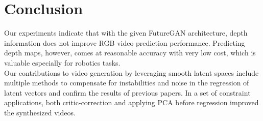 \documentclass[10pt,twocolumn,letterpaper]{article}
\begin{document}
\section{Conclusion}
	Our experiments indicate that with the given FutureGAN architecture, depth information does not improve RGB video prediction performance. Predicting depth maps, however, comes at reasonable accuracy with very low cost, which is valuable especially for robotics tasks. \\
	Our contributions to video generation by leveraging smooth latent spaces include multiple methods to compensate for instabilities and noise in the regression of latent vectors and confirm the results of previous papers. In a set of constraint applications, both critic-correction and applying PCA before regression improved the synthesized videos.
{\small


}
\end{document}
